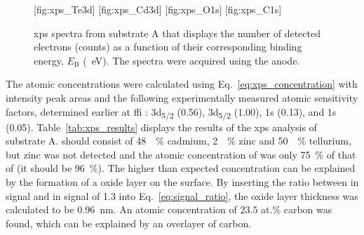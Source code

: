 \begin{figure}[htbp]
    \centering
    [fig:xps_Te3d]
    [fig:xps_Cd3d]
    [fig:xps_O1s]
    [fig:xps_C1s]
    \caption[\Ac{xps} spectra from substrate A.]{\Acf{xps} spectra from substrate A that displays the number of detected electrons (counts) as a function of their corresponding binding energy, $E_\mathrm{B}$ (\SI{}{\electronvolt}). The spectra were acquired using the  anode.}
    \label{fig:xps_spectra}
\end{figure}
 
The atomic concentrations were calculated using Eq.~\eqref{eq:xps_concentration} with intensity peak areas and the following experimentally measured atomic sensitivity factors, determined earlier at \ac{ffi} \citep{hirsch1999x-ray}:  3d\textsubscript{5/2} (0.56),  3d\textsubscript{5/2} (1.00),  1s (0.13), and  1s (0.05). Table~\ref{tab:xps_results} displays the results of the \ac{xps} analysis of substrate A.  should consist of \SI{48}{\atomic\percent} cadmium, \SI{2}{\atomic\percent} zinc and \SI{50}{\atomic\percent} tellurium, but zinc was not detected and the atomic concentration of  was only \SI{75}{\percent} of that of  (it should be \SI{96}{\percent}). The higher than expected  concentration can be explained by the formation of a  oxide layer on the surface. By inserting the ratio between  in  signal and  in  signal of \SI{1.3}{} into Eq.~\eqref{eq:signal_ratio}, the  oxide layer thickness was calculated to be \SI{0.96}{\nano\metre}. An atomic concentration of $23.5$ at.\% carbon was found, which can be explained by an overlayer of carbon. 

